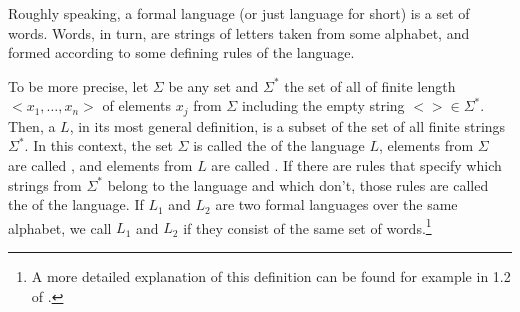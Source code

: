 Roughly speaking, a formal language (or just language for short) is a set of words. Words, in turn, are strings of letters taken from some alphabet, and formed according to some defining rules of the language. 

To be more precise, let $\Sigma$ be any set and $\Sigma^*$ the set of all  of finite length $<x_1,\ldots,x_n>$ of elements $x_j$ from $\Sigma$ including the empty string $<>\in \Sigma^*$. Then, a  $L$, in its most general definition, is a subset of the set of all finite strings $\Sigma^*$. In this context, the set $\Sigma$ is called the  of the language $L$, elements from $\Sigma$ are called , and elements from $L$ are called . 
If there are rules that specify which strings from $\Sigma^*$ belong to the language and which don't, those rules are called the  of the language. If $L_1$ and $L_2$ are two formal languages over the same alphabet, we call $L_1$ and $L_2$  if they consist of the same set of words.\footnote{A more detailed explanation of this definition can be found for example in \secname{} 1.2 of \cite{moll-2012}.}

